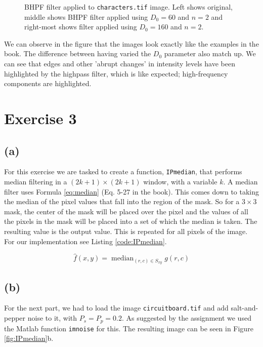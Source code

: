 \documentclass{article}
\begin{document}
\begin{figure}[ht]
    \centering
    
    \caption{BHPF filter applied to \texttt{characters.tif} image. Left shows original, middle shows BHPF filter applied using $D_0 = 60$ and $n = 2$ and right-most shows filter applied using $D_0 = 160$ and $n = 2$.}
    \label{fig:characters_all_bhpf}
\end{figure}

We can observe in the figure that the images look exactly like the examples in the book. The difference between having varied the $D_0$ parameter also match up. We can see that edges and other 'abrupt changes' in intensity levels have been highlighted by the highpass filter, which is like expected; high-frequency components are highlighted.

\section*{Exercise 3}
\subsection*{(a)}
For this exercise we are tasked to create a function, \texttt{IPmedian}, that performs median filtering in a $(2k + 1) \times (2k + 1)$ window, with a variable $k$. A median filter uses Formula \ref{eq:median} (Eq. 5-27 in the book). This comes down to taking the median of the pixel values that fall into the region of the mask. So for a $3 \times 3$ mask, the center of the mask will be placed over the pixel and the values of all the pixels in the mask will be placed into a set of which the median is taken. The resulting value is the output value. This is repeated for all pixels of the image. For our implementation see  Listing \ref{code:IPmedian}.

\begin{equation}\label{eq:median}
    \widehat{f}(x, y)=\operatorname{median}_{(r, c) \in S_{x y}} g(r, c)
\end{equation}

\subsection*{(b)}
For the next part, we had to load the image \texttt{circuitboard.tif} and add salt-and-pepper noise to it, with $P_s = P_p = 0.2$. As suggested by the assignment we used the Matlab function \texttt{imnoise} for this. The resulting image can be seen in Figure \ref{fig:IPmedian}b.
\end{document}
